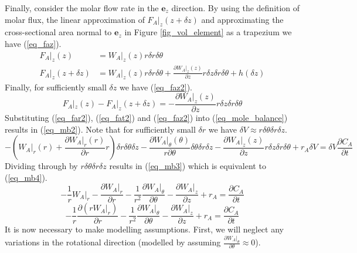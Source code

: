 \documentclass[11pt,fleqn]{article}
\theoremstyle{defstyle}
\begin{document}
Finally, consider the molar flow rate in the $\mathbf{e}_z$ direction. By using the definition of molar flux, the linear approximation of $F_A|_z(z+\delta z)$ and approximating the cross-sectional area normal to $\mathbf{e}_z$ in Figure \ref{fig_vol_element} as a trapezium we have (\ref{eq_faz}).
\begin{equation}
\begin{aligned}
F_A|_z(z) &= W_A|_z(z) r \delta r \delta \theta \\
F_A|_z(z + \delta z) &= W_A|_z(z) r \delta r \delta \theta + \frac{\partial W_A|_z(z)}{\partial z}r \delta z \delta r \delta \theta + h(\delta z)
\end{aligned}
\label{eq_faz}
\end{equation}
Finally, for sufficiently small $\delta z$ we have (\ref{eq_faz2}).
\begin{equation}
F_A|_z(z) - F_A|_z(z + \delta z) = - \frac{\partial W_A|_z(z)}{\partial z}r \delta z \delta r \delta \theta
\label{eq_faz2}
\end{equation}
Substituting (\ref{eq_far2}), (\ref{eq_fat2}) and (\ref{eq_faz2}) into (\ref{eq_mole_balance}) results in (\ref{eq_mb2}). Note that for sufficiently small $\delta r$ we have $\delta V \approx r \delta \theta \delta r \delta z$.
\begin{equation}
- \left(W_ A|_r(r)  + \frac{\partial W_A|_r(r)}{\partial r}r\right) \delta r \delta \theta \delta z - \frac{\partial W_A|_\theta(\theta)}{r \partial \theta}\delta \theta\delta r \delta z - \frac{\partial W_A|_z(z)}{\partial z}r \delta z \delta r \delta \theta + r_A \delta V = \delta V \frac{\partial C_A}{\partial t}
\label{eq_mb2}
\end{equation}
Dividing through by $r \delta \theta \delta r \delta z$ results in (\ref{eq_mb3}) which is equivalent to (\ref{eq_mb4}).
\begin{equation}
-\frac{1}{r} W_A|_r - \frac{\partial W_A|_r}{\partial r} - \frac{1}{r^2}\frac{\partial W_A|_\theta}{\partial \theta} - \frac{\partial W_A|_z}{\partial z}+ r_A  = \frac{\partial C_A}{\partial t}
\label{eq_mb3}
\end{equation}
\begin{equation}
-\frac{1}{r} \frac{\partial (rW_A|_r)}{\partial r} - \frac{1}{r^2}\frac{\partial W_A|_\theta}{\partial \theta} - \frac{\partial W_A|_z}{\partial z}+ r_A  = \frac{\partial C_A}{\partial t}
\label{eq_mb4}
\end{equation}
It is now necessary to make modelling assumptions. First, we will neglect any variations in the rotational direction (modelled by assuming $\frac{\partial W_A|_\theta}{\partial \theta} \approx 0$).
\end{document}
